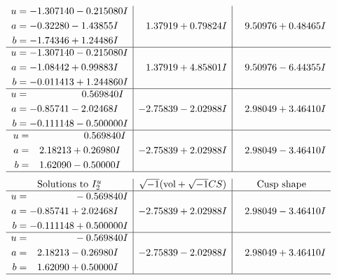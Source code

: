 \documentclass[1p]{elsarticle_modified}
\theoremstyle{definition}
\newcommand{\I}{\sqrt{-1}}
\begin{document}
$$\begin{array}{c|c|c}
\begin{aligned}
u &= -1.307140 - 0.215080 I \\
a &= -0.32280 - 1.43855 I \\
b &= -1.74346 + 1.24486 I\end{aligned}
 & \phantom{-}1.37919 + 0.79824 I & \phantom{-}9.50976 + 0.48465 I \\ \hline\begin{aligned}
u &= -1.307140 - 0.215080 I \\
a &= -1.08442 + 0.99883 I \\
b &= -0.011413 + 1.244860 I\end{aligned}
 & \phantom{-}1.37919 + 4.85801 I & \phantom{-}9.50976 - 6.44355 I \\ \hline\begin{aligned}
u &= \phantom{-0.000000 -}0.569840 I \\
a &= -0.85741 - 2.02468 I \\
b &= -0.111148 - 0.500000 I\end{aligned}
 & -2.75839 - 2.02988 I & \phantom{-}2.98049 + 3.46410 I \\ \hline\begin{aligned}
u &= \phantom{-0.000000 -}0.569840 I \\
a &= \phantom{-}2.18213 + 0.26980 I \\
b &= \phantom{-}1.62090 - 0.50000 I\end{aligned}
 & -2.75839 + 2.02988 I & \phantom{-}2.98049 - 3.46410 I\\
 \hline 
 \end{array}$$\newpage$$\begin{array}{c|c|c}  
\text{Solutions to }I^u_{2}& \I (\text{vol} + \sqrt{-1}CS) & \text{Cusp shape}\\
 \hline 
\begin{aligned}
u &= \phantom{-0.000000 } -0.569840 I \\
a &= -0.85741 + 2.02468 I \\
b &= -0.111148 + 0.500000 I\end{aligned}
 & -2.75839 + 2.02988 I & \phantom{-}2.98049 - 3.46410 I \\ \hline\begin{aligned}
u &= \phantom{-0.000000 } -0.569840 I \\
a &= \phantom{-}2.18213 - 0.26980 I \\
b &= \phantom{-}1.62090 + 0.50000 I\end{aligned}
 & -2.75839 - 2.02988 I & \phantom{-}2.98049 + 3.46410 I\\
 \hline 
 \end{array}$$\newpage
\end{document}
